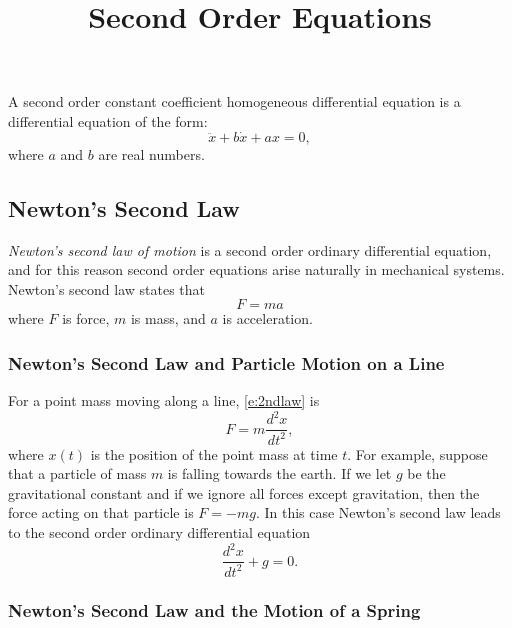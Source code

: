 \documentclass{ximera}
\title{Second Order Equations}
\begin{document}
\begin{abstract}
\end{abstract}
\maketitle

  \label{S:SOE}

A second order constant coefficient
homogeneous differential equation
is a differential equation of the form:
\begin{equation} \label{eq:soex1}
\ddot{x} + b\dot{x} + ax = 0,
\end{equation}
where $a$ and $b$ are real numbers.

\subsection*{Newton's Second Law}

{\em Newton's second law of motion\/} is a second order ordinary
differential equation, and for this reason second order equations arise
naturally in mechanical systems.  Newton's second law states that
\begin{equation}  \label{e:2ndlaw}
F=ma
\end{equation}
where $F$ is force, $m$ is mass,
and $a$ is acceleration.

\subsubsection*{Newton's Second Law and Particle Motion on a Line}

For a point mass moving along a line, \eqref{e:2ndlaw} is
\begin{equation} \label{E:F=ma}
F=m\frac{d^2x}{dt^2},
\end{equation}
where $x(t)$ is the position of the point mass at time $t$.
For example, suppose that a particle of mass $m$ is falling towards
the earth.  If we let $g$ be the gravitational constant and if we
ignore all forces except gravitation, then the force acting on that
particle is $F=-mg$.  In this case Newton's second law leads to the
second order ordinary differential equation
\begin{equation} \label{e:pointpart}
\frac{d^2x}{dt^2}+g=0.
\end{equation}

\subsubsection*{Newton's Second Law and the Motion of a Spring}
 
\end{document}
